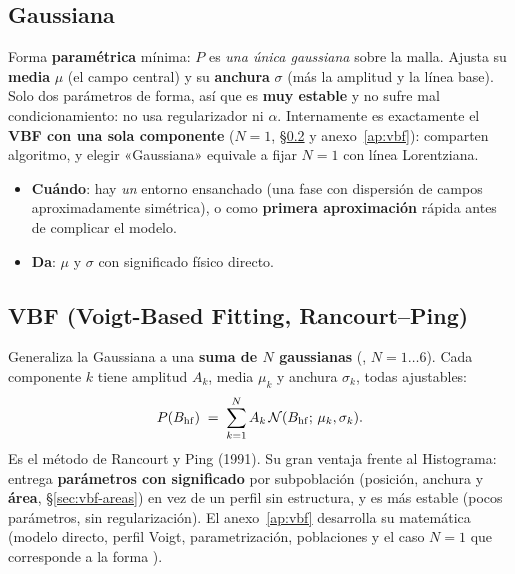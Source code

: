 \subsection{Gaussiana}
\label{sec:forma-gaussiana}

Forma \textbf{paramétrica} mínima: $P$ es \emph{una única gaussiana} sobre la
malla. Ajusta su \textbf{media} $\mu$ (el campo central) y su \textbf{anchura}
$\sigma$ (más la amplitud y la línea base). Solo dos parámetros de forma, así que
es \textbf{muy estable} y no sufre mal condicionamiento: no usa regularizador ni
$\alpha$. Internamente es exactamente el \textbf{VBF con una sola componente}
($N=1$, §\ref{sec:forma-vbf} y anexo~\ref{ap:vbf}): comparten algoritmo, y elegir
«Gaussiana» equivale a fijar $N=1$ con línea Lorentziana.

\begin{itemize}[nosep]
  \item \textbf{Cuándo}: hay \emph{un} entorno ensanchado (una fase con dispersión
        de campos aproximadamente simétrica), o como \textbf{primera
        aproximación} rápida antes de complicar el modelo.
  \item \textbf{Da}: $\mu$ y $\sigma$ con significado físico directo.
\end{itemize}

\subsection{VBF (Voigt-Based Fitting, Rancourt--Ping)}
\label{sec:forma-vbf}

Generaliza la Gaussiana a una \textbf{suma de $N$ gaussianas}
(, $N=1\ldots6$). Cada componente $k$ tiene amplitud $A_k$,
media $\mu_k$ y anchura $\sigma_k$, todas ajustables:
\[
  P(B_{\mathrm{hf}}) \;=\; \sum_{k=1}^{N} A_k \,
  \mathcal{N}(B_{\mathrm{hf}};\,\mu_k,\sigma_k).
\]
Es el método de Rancourt y Ping (1991). Su gran ventaja frente al Histograma:
entrega \textbf{parámetros con significado} por subpoblación (posición, anchura y
\textbf{área}, §\ref{sec:vbf-areas}) en vez de un perfil sin estructura, y es más
estable (pocos parámetros, sin regularización). El anexo~\ref{ap:vbf} desarrolla
su matemática (modelo directo, perfil Voigt, parametrización, poblaciones y el
caso $N=1$ que corresponde a la forma ).


